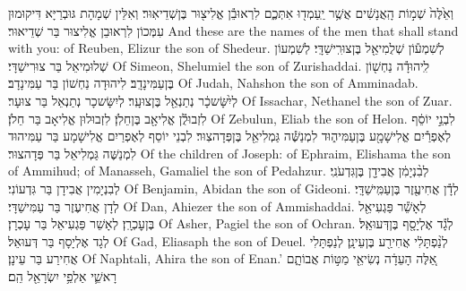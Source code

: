 {וְאֵ֙לֶּה֙ שְׁמ֣וֹת הָֽאֲנָשִׁ֔ים אֲשֶׁ֥ר יַֽעַמְד֖וּ אִתְּכֶ֑ם לִרְאוּבֵ֕ן אֱלִיצ֖וּר בֶּן\maqqaf שְׁדֵיאֽוּר׃}
{וְאִלֵּין שְׁמָהָת גּוּבְרַיָּא דִּיקוּמוּן עִמְּכוֹן לִרְאוּבֵן אֱלִיצוּר בַּר שְׁדֵיאוּר׃}
{And these are the names of the men that shall stand with you: of Reuben, Elizur the son of Shedeur.}{}
{לְשִׁמְע֕וֹן שְׁלֻמִיאֵ֖ל בֶּן\maqqaf צוּרִֽישַׁדָּֽי׃}
{לְשִׁמְעוֹן שְׁלוּמִיאֵל בַּר צוּרִישַׁדָּי׃}
{Of Simeon, Shelumiel the son of Zurishaddai.}{}
{לִֽיהוּדָ֕ה נַחְשׁ֖וֹן בֶּן\maqqaf עַמִּינָדָֽב׃}
{לִיהוּדָה נַחְשׁוֹן בַּר עַמִּינָדָב׃}
{Of Judah, Nahshon the son of Amminadab.}{}
{לְיִ֨שָּׂשכָ֔ר נְתַנְאֵ֖ל בֶּן\maqqaf צוּעָֽר׃}
{לְיִשָּׂשכָר נְתַנְאֵל בַּר צוּעָר׃}
{Of Issachar, Nethanel the son of Zuar.}{}
{לִזְבוּלֻ֕ן אֱלִיאָ֖ב בֶּן\maqqaf חֵלֹֽן׃}
{לִזְבוּלוּן אֱלִיאָב בַּר חֵלֹן׃}
{Of Zebulun, Eliab the son of Helon.}{}
{לִבְנֵ֣י יוֹסֵ֔ף לְאֶפְרַ֕יִם אֱלִישָׁמָ֖ע בֶּן\maqqaf עַמִּיה֑וּד לִמְנַשֶּׁ֕ה גַּמְלִיאֵ֖ל בֶּן\maqqaf פְּדָהצֽוּר׃}
{לִבְנֵי יוֹסֵף לְאֶפְרַיִם אֱלִישָׁמָע בַּר עַמִּיהוּד לִמְנַשֶּׁה גַּמְלִיאֵל בַּר פְּדָהצוּר׃}
{Of the children of Joseph: of Ephraim, Elishama the son of Ammihud; of Manasseh, Gamaliel the son of Pedahzur.}{}
{לְבִ֨נְיָמִ֔ן אֲבִידָ֖ן בֶּן\maqqaf גִּדְעֹנִֽי׃}
{לְבִנְיָמִין אֲבִידָן בַּר גִּדְעוֹנִי׃}
{Of Benjamin, Abidan the son of Gideoni.}{}
{לְדָ֕ן אֲחִיעֶ֖זֶר בֶּן\maqqaf עַמִּֽישַׁדָּֽי׃}
{לְדָן אֲחִיעֶזֶר בַּר עַמִּישַׁדָּי׃}
{Of Dan, Ahiezer the son of Ammishaddai.}{}
{לְאָשֵׁ֕ר פַּגְעִיאֵ֖ל בֶּן\maqqaf עׇכְרָֽן׃}
{לְאָשֵׁר פַּגְעִיאֵל בַּר עָכְרָן׃}
{Of Asher, Pagiel the son of Ochran.}{}
{לְגָ֕ד אֶלְיָסָ֖ף בֶּן\maqqaf דְּעוּאֵֽל׃}
{לְגָד אֶלְיָסָף בַּר דְּעוּאֵל׃}
{Of Gad, Eliasaph the son of Deuel.}{}
{לְנַ֨פְתָּלִ֔י אֲחִירַ֖ע בֶּן\maqqaf עֵינָֽן׃}
{לְנַפְתָּלִי אֲחִירַע בַּר עֵינָן׃}
{Of Naphtali, Ahira the son of Enan.’}{}
{אֵ֚לֶּה  הָעֵדָ֔ה נְשִׂיאֵ֖י מַטּ֣וֹת אֲבוֹתָ֑ם רָאשֵׁ֛י אַלְפֵ֥י יִשְׂרָאֵ֖ל הֵֽם׃}
